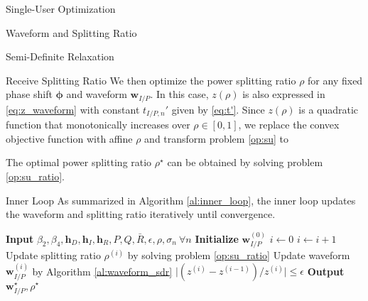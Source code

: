 \documentclass{IEEEtran}
\begin{document}
\begin{section}{Single-User Optimization}
\begin{subsection}{Waveform and Splitting Ratio}
\begin{subsubsection}{Semi-Definite Relaxation}
			\begin{paragraph}{Receive Splitting Ratio}
				We then optimize the power splitting ratio $\rho$ for any fixed phase shift $\boldsymbol{\phi}$ and waveform $\boldsymbol{w}_{I/P}$. In this case, $z(\rho)$ is also expressed in \ref{eq:z_waveform} with constant $t_{I/P,n}'$ given by \ref{eq:t'}. Since $z(\rho)$ is a quadratic function that monotonically increases over $\rho \in [0, 1]$, we replace the convex objective function with affine $\rho$ and transform problem \ref{op:su} to
				\begin{maxi!}
					{\rho}{\rho}{\label{op:su_ratio}}{\label{eq:su_ratio_target}}
				\end{maxi!}
				The optimal power splitting ratio $\rho^\star$ can be obtained by solving problem \ref{op:su_ratio}.
			\end{paragraph}

			\begin{paragraph}{Inner Loop}
				As summarized in Algorithm \ref{al:inner_loop}, the inner loop updates the waveform and splitting ratio iteratively until convergence.
				\begin{algorithm}
					\caption{Inner Loop: Waveform and Splitting Ratio}
					\label{al:inner_loop}
					\begin{algorithmic}[1]
						\State \textbf{Input} $\beta_2,\beta_4,\boldsymbol{h}_D,\boldsymbol{h}_I,\boldsymbol{h}_R,P,Q,\bar{R},\epsilon,\rho,\sigma_n \ \forall n$
						\State \textbf{Initialize} $\boldsymbol{w}_{I/P}^{(0)}$
						\State $i \gets 0$
						\Repeat
						\State $i \gets i + 1$
						\State Update splitting ratio $\rho^{(i)}$ by solving problem \ref{op:su_ratio}
						\State Update waveform $\boldsymbol{w}_{I/P}^{(i)}$ by Algorithm \ref{al:waveform_sdr}
						\Until $\lvert (z^{(i)}-z^{(i-1)}) / z^{(i)} \rvert \le \epsilon$
						\State \textbf{Output} $\boldsymbol{w}_{I/P}^{\star}, \rho^{\star}$
					\end{algorithmic}
				\end{algorithm}
			\end{paragraph}
		\end{subsubsection}
	\end{subsection}


\end{section}
\end{document}
